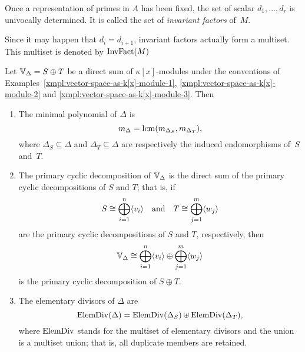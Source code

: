 \begin{defn}
    Once a representation of primes in $A$ has been fixed, the set of scalar $d_1,\dots,d_r$ is univocally determined. It is called the set of \textsl{invariant factors} of~$M$.
\end{defn}

\begin{ntn}
     Since it may happen that\/ $d_i=d_{i+1}$, invariant factors actually form a multiset. This multiset is denoted by\/ $\operatorname{InvFact}(M)$
\end{ntn}

\begin{xmpl}\label{xmpl:vector-space-as-k[x]-module-4}
    Let $\mathbb V_\Delta=S\oplus T$ be a direct sum of $\kappa[x]$-modules under the conventions of Examples~\ref{xmpl:vector-space-as-k[x]-module-1}, \ref{xmpl:vector-space-as-k[x]-module-2} and \ref{xmpl:vector-space-as-k[x]-module-3}. Then
    \begin{enumerate}[\rm a)]
        \item The minimal polynomial of $\Delta$ is 
        $$
            m_\Delta = \operatorname{lcm}(m_{\Delta_S},m_{\Delta_T}),
        $$
        where $\Delta_S\subseteq\Delta$ and $\Delta_T\subseteq\Delta$ are respectively the induced endomorphisms of~$S$ and~$T$.
    
        \item The primary cyclic decomposition of $\mathbb V_\Delta$ is the direct sum of the primary cyclic decompositions of $S$ and $T$; that is, if 
        $$
            S \cong \bigoplus_{i=1}^n\langle v_i\rangle \quad
                \text{and} \quad 
            T \cong \bigoplus_{j=1}^m\langle w_j\rangle
        $$
        are the primary cyclic decompositions of $S$ and $T$, respectively, then
        $$
            \mathbb V_\Delta \cong \bigoplus_{i=1}^n\langle v_i\rangle
                \oplus \bigoplus_{j=1}^m \langle w_j\rangle
        $$
        is the primary cyclic decomposition of $S \oplus T$.
    
        \item The elementary divisors of $\Delta$ are 
        $$
            \operatorname{ElemDiv}(\Delta) = \operatorname{ElemDiv}(\Delta_S)
                \uplus \operatorname{ElemDiv}(\Delta_T),
        $$
        where $\operatorname{ElemDiv}$ stands for the multiset of elementary divisors and the union is a multiset union; that is, all duplicate members are retained.
    \end{enumerate}
\end{xmpl}

